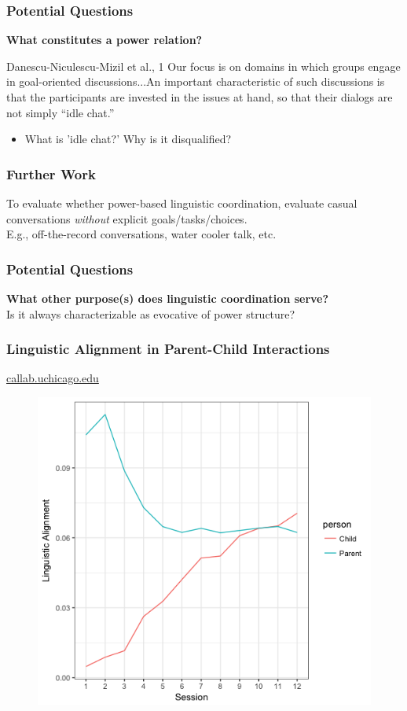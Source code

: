 \documentclass{beamer}
\begin{document}
\begin{frame}
\frametitle{Potential Questions}
\textbf{What constitutes a power relation?}
\begin{block}{Danescu-Niculescu-Mizil et al., 1}
Our focus is on domains in which groups engage in goal-oriented discussions...An important characteristic of such discussions is that the participants are invested in the issues at hand, so that their dialogs are not simply “idle chat.”
\end{block}

\begin{itemize}
	\item What is 'idle chat?' Why is it disqualified?
\end{itemize}

\end{frame}
\begin{frame}
\frametitle{Further Work}
To evaluate whether power-based linguistic coordination, evaluate casual conversations \textit{without} explicit goals/tasks/choices. \\
\quad E.g., off-the-record conversations, water cooler talk, etc.
\end{frame}
\begin{frame}
\frametitle{Potential Questions}
\textbf{What other purpose(s) does linguistic coordination serve?} \\
Is it always characterizable as evocative of power structure?
\end{frame}
\begin{frame}
\frametitle{Linguistic Alignment in Parent-Child Interactions}
\href{http://callab.uchicago.edu}{callab.uchicago.edu}
\begin{figure}
\includegraphics[width=0.6\linewidth]{childalign1.png}
\end{figure}
\end{frame}
\end{document}
